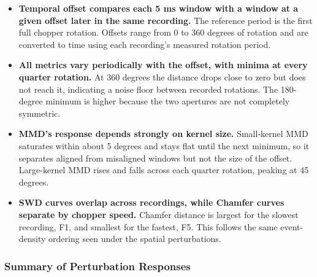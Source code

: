 \begin{itemize}
    \item \textbf{Temporal offset compares each 5 ms window with a window at a given offset later in the same recording.} The reference period is the first full chopper rotation. Offsets range from 0 to 360 degrees of rotation and are converted to time using each recording's measured rotation period.

    \item \textbf{All metrics vary periodically with the offset, with minima at every quarter rotation.} At 360 degrees the distance drops close to zero but does not reach it, indicating a noise floor between recorded rotations. The 180-degree minimum is higher because the two apertures are not completely symmetric.

    \item \textbf{MMD's response depends strongly on kernel size.} Small-kernel MMD saturates within about 5 degrees and stays flat until the next minimum, so it separates aligned from misaligned windows but not the size of the offset. Large-kernel MMD rises and falls across each quarter rotation, peaking at 45 degrees.

    \item \textbf{SWD curves overlap across recordings, while Chamfer curves separate by chopper speed.} Chamfer distance is largest for the slowest recording, F1, and smallest for the fastest, F5. This follows the same event-density ordering seen under the spatial perturbations.
\end{itemize}

\subsubsection{Summary of Perturbation Responses}

